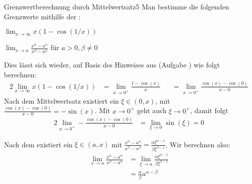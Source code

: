 \documentclass[Uebungsblatt]{Lilly}
\begin{document}
\begin{aufgabe}{Grenzwertberechnung durch Mittelwertsatz}{5}
    Man bestimme die folgenden Grenzwerte mithilfe der :
        \begin{aufgaben}[2]
            \item \(\displaystyle \lim_{x \to \infty} x ( 1 - \cos (1/x))\)
            \item \(\lim_{x \to a} \frac{x^\alpha - a^\alpha}{x^\beta - a^\beta}\) für \(a > 0, \beta \neq 0\)
        \end{aufgaben}
\vSplitter
    \begin{aufgaben}
        \item Dies lässt sich wieder, auf Basis des Hinweises aus (Aufgabe ) wie folgt berechnen: \begin{alignat*}{2}
            \lim_{x \to \infty} x(1 - \cos(1/x)) &= \lim_{x \to 0^+} \frac{1 - \cos(x)}{x} &&= \lim_{x \to 0^+} \frac{\cos (x) - \cos (0)}{x - 0}
        \end{alignat*}
        Nach dem Mittelwertsatz existiert ein \(\xi \in (0,x)\), mit \(\frac{\cos(x) - \cos(0)}{x - 0} = - \sin(x)\).
        Mit \(x \to 0^+\) geht auch \(\xi \to 0^+\), damit folgt \begin{alignat*}{2}
            \lim_{x \to 0^+} - \frac{\cos (x) - \cos (0)}{x - 0} &= \lim_{\xi \to 0} \sin(\xi) = 0
        \end{alignat*}
        \item Nach dem  existiert ein \(\xi \in (a,x)\) mit \(\frac{x^\alpha - a^\alpha}{x^\beta - \alpha^\beta} = \frac{\alpha\xi^{\alpha-1}}{\beta \xi^{\beta-1}}\). Wir berechnen also: \begin{align*}
            \lim_{x \to a} \frac{x^\alpha - a^\alpha}{x^\beta - a^\beta} &= \lim_{\xi \to a} \frac{ \alpha \xi^{\alpha-1}}{\beta \xi^{\beta-1}} \\
            &= \frac{\alpha}{\beta} a^{\alpha-\beta}
        \end{align*}
    \end{aufgaben}
\end{aufgabe}
\end{document}
